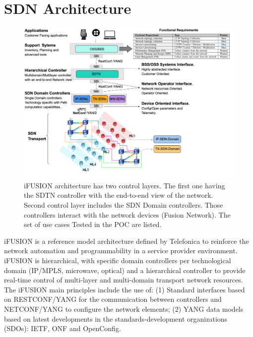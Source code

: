 \documentclass[10pt, conference]{IEEEtran}
\begin{document}
\section{SDN Architecture}
\label{section:arq}
\begin{figure}[htp]
	\centering
	\includegraphics[width=\linewidth]{figs/diagram-1.png}
	\caption{i\uppercase{FUSION}\cite{contreras2019ifusion} architecture has two control layers. The first one having the SDTN controller with the end-to-end view of the network. Second control layer includes the SDN Domain controllers. Those controllers interact with the network devices (Fusion Network). The set of use cases Tested in the POC are listed.}
	\label{FIG:1}
\end{figure}


i\uppercase{FUSION} is a reference model architecture defined by Telefonica to reinforce the network automation and programmability in a service provider environment. i\uppercase{FUSION} is hierarchical, with specific domain controllers per technological domain (IP/MPLS, microwave, optical)
and a hierarchical controller to provide real-time control of multi-layer and multi-domain transport network resources. The i\uppercase{FUSION} main principles include the use of: (1) Standard interfaces based on \uppercase{RESTconf/YANG} \cite{bierman2017restconf} for the communication between controllers and \uppercase{NETCONF/YANG} \cite{enns2011network} to configure the network elements; (2) YANG data models based on latest developments in the standards-development organizations (SDOs): \uppercase{IETF}, \uppercase{ONF} and OpenConfig.
\end{document}
